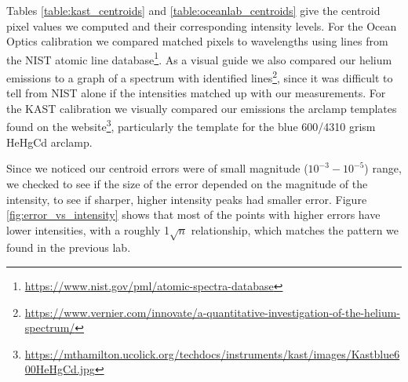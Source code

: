 \documentclass[preprint]{aastex62}
\begin{document}
Tables \ref{table:kast_centroids} and \ref{table:oceanlab_centroids} give the centroid pixel values we computed and their corresponding intensity levels. For the Ocean Optics calibration we compared matched pixels to wavelengths using lines from the NIST atomic line database\footnote{\href{https://www.nist.gov/pml/atomic-spectra-database}{https://www.nist.gov/pml/atomic-spectra-database}}. As a visual guide we also compared our helium emissions to a graph of a spectrum with identified lines\footnote{\href{https://www.vernier.com/innovate/a-quantitative-investigation-of-the-helium-spectrum/}{https://www.vernier.com/innovate/a-quantitative-investigation-of-the-helium-spectrum/}}, since it was difficult to tell from NIST alone if the intensities matched up with our measurements. For the KAST calibration we visually compared our emissions the arclamp templates found on the website\footnote{\href{https://mthamilton.ucolick.org/techdocs/instruments/kast/images/Kastblue600HeHgCd.jpg}{https://mthamilton.ucolick.org/techdocs/instruments/kast/images/Kastblue600HeHgCd.jpg}}, particularly the template for the blue 600/4310 grism HeHgCd arclamp.

Since we noticed our centroid errors were of small magnitude ($10^{-3}-10^{-5}$) range, we checked to see if the size of the error depended on the magnitude of the intensity, to see if sharper, higher intensity peaks had smaller error. Figure \ref{fig:error_vs_intensity} shows that most of the points with higher errors have lower intensities, with a roughly 1$\sqrt{n}$ relationship, which matches the pattern we found in the previous lab.
\end{document}
